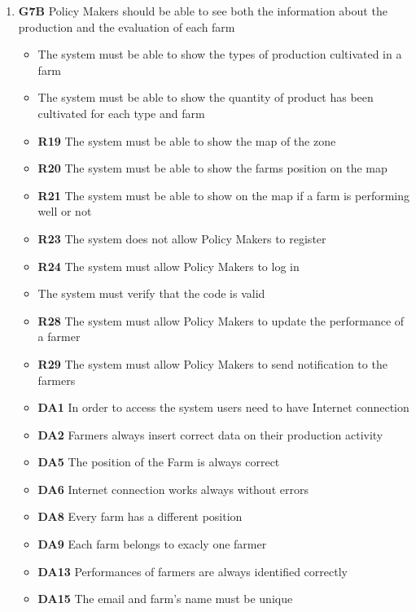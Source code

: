 \begin{itemize}
\begin{enumerate}
\begin{itemize}
        \end{itemize}
        \item\textbf{G7B} Policy Makers should be able to see both the information about the production and the evaluation of each farm
        \begin{itemize}
            \renewcommand\labelitemi{--}
            \item \textbf{} The system must be able to show the types of production cultivated in a farm
            \item \textbf{} The system must be able to show the quantity of product has been cultivated for each type and farm
            \item \textbf{R19} The system must be able to show the map of the zone
            \item \textbf{R20} The system must be able to show the farms position on the map
            \item \textbf{R21} The system must be able to show on the map if a farm is performing well or not
            \item \textbf{R23} The system does not allow Policy Makers to register
            \item \textbf{R24} The system must allow Policy Makers to log in
            \item \textbf{} The system must verify that the code is valid
            \item \textbf{R28} The system must allow Policy Makers to update the performance of a farmer
            \item \textbf{R29} The system must allow Policy Makers to send notification to the farmers
            \item \textbf{DA1} In order to access the system users need to have Internet connection
            \item \textbf{DA2} Farmers always insert correct data on their production activity
            \item \textbf{DA5} The position of the Farm is always correct
            \item \textbf{DA6} Internet connection works always without errors
            \item \textbf{DA8} Every farm has a different position
            \item \textbf{DA9} Each farm belongs to exacly one farmer
            \item \textbf{DA13} Performances of farmers are always identified correctly
            \item \textbf{DA15} The email and farm's name must be unique

\end{itemize}
\end{enumerate}
\end{itemize}
